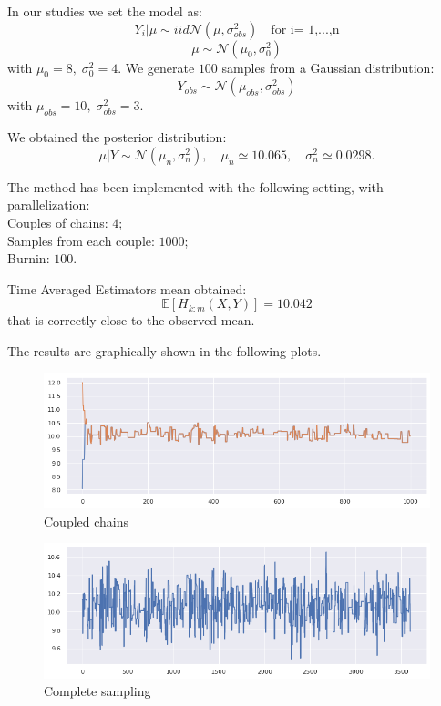\documentclass {article}
\begin{document}
In our studies we set the model as:
$$ Y_i | \mu \sim{iid} \mathcal{N}(\mu, \sigma_{obs} ^2) \quad \text{for i= 1,...,n} $$
$$ \mu  \sim \mathcal{N}(\mu_0, \sigma_0^2)$$
with $\mu_0 = 8, \; \sigma^2_0 = 4$.
We generate $100$ samples from a Gaussian distribution:
$$
Y_{obs} \sim \mathcal{N}(\mu_{obs}, \sigma_{obs} ^2)
$$
with
$
\mu_{obs} = 10, \;
\sigma_{obs} ^2 = 3
$.

We obtained the posterior distribution:
$$  
	\mu | Y \sim \mathcal{N}(\mu_n, \sigma^2_n), 
	\quad \mu_n  \simeq 10.065,
	\quad \sigma^2_n \simeq 0.0298.
$$

The method has been implemented with the following setting, with parallelization:\\
Couples of chains: $4$;\\
Samples from each couple: $1000$;\\
Burnin: $100$.


Time Averaged Estimators mean obtained:
$$ 
	\mathbb{E}[H_{k:m}(X,Y)] = 10.042
$$
that is correctly close to the observed mean.
		
The results are graphically shown in the following plots.

	\begin{figure}[h!]
		\centering
		\includegraphics[width=\textwidth]{immagini_coupling/2_catene_coupling}	
		\caption{Coupled chains}
		\label{coupl1}
	\end{figure}

	\begin{figure}[h!]
		\centering
		\includegraphics[width=\textwidth]{immagini_coupling/traceplot_coupling}
		\caption{Complete sampling}
		\label{coupl2}
	\end{figure}
\end{document}
